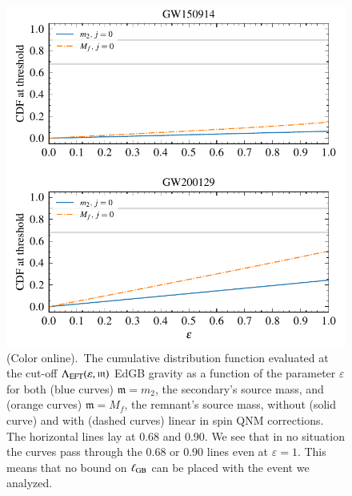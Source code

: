 \documentclass[twocolumn,
               prd,
               aps,
               superscriptaddress,
               tightenlines,
               nofootinbib,
               eqsecnum,
               amsfonts,
               amsmath,
               longbibliography]{revtex4-1}
\newcommand{\gm}{\mathfrak{m}}
\begin{document}
\begin{figure}[t]
\includegraphics[width=\columnwidth]{figs/edgb_cdf_varying_threshold.pdf}
\caption{(Color online).~The cumulative distribution function evaluated at the
cut-off $\Lambda_{\rm EFT}(\varepsilon,\gm)$ EdGB gravity as a function of the parameter
$\varepsilon$ for both (blue curves) $\gm = m_2$, the secondary's source
mass, and (orange curves) $\gm = M_{f}$, the remnant's source mass, without
(solid curve) and with (dashed curves) linear in spin QNM corrections. The
horizontal lines lay at 0.68 and 0.90. We see that in no situation the curves pass
through the 0.68 or 0.90 lines even at $\varepsilon = 1$. This means that no bound on $\ell_{\rm GB}$
can be placed with the event we analyzed.
}
\label{fig:dcs_cdf}
\end{figure}
\end{document}
